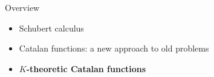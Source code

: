 \documentclass{beamer}
\begin{document}
\begin{frame}{Overview}
  \begin{itemize}
  \item Schubert calculus
  \item Catalan functions: a new approach to old problems
  \item \textbf{\(K\)-theoretic Catalan functions}
  \end{itemize}
\end{frame}
\end{document}
